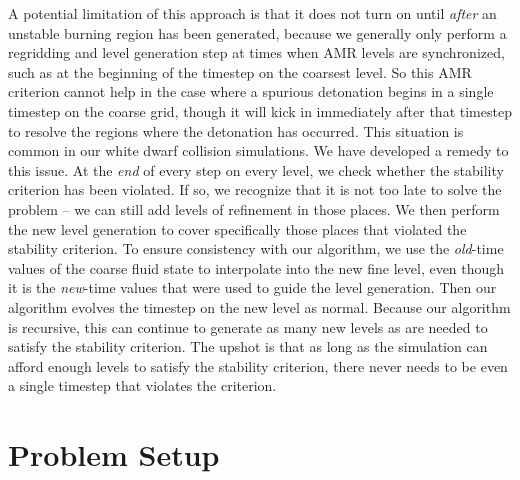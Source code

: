 \documentclass[twocolumn,numberedappendix]{../aastex6}
\begin{document}
A potential limitation of this approach is that it does not turn on
until \textit{after} an unstable burning region has been generated,
because we generally only perform a regridding and level generation
step at times when AMR levels are synchronized, such as at the beginning
of the timestep on the coarsest level. So this AMR criterion cannot
help in the case where a spurious detonation begins in a single timestep
on the coarse grid, though it will kick in immediately after that
timestep to resolve the regions where the detonation has occurred.
This situation is common in our white dwarf collision simulations.
We have developed a remedy to this issue. At the \textit{end} of every step
on every level, we check whether the stability criterion has been violated.
If so, we recognize that it is not too late to solve the problem -- we can
still add levels of refinement in those places. We then perform the new level
generation to cover specifically those places that violated the stability criterion.
To ensure consistency with our algorithm, we use the \textit{old}-time values
of the coarse fluid state to interpolate into the new fine level, even
though it is the \textit{new}-time values that were used to guide the level
generation. Then our algorithm evolves the timestep on the new level as normal.
Because our algorithm is recursive, this can continue to generate
as many new levels as are needed to satisfy the stability criterion.
The upshot is that as long as the simulation can afford enough levels to
satisfy the stability criterion, there never needs to be even a single timestep
that violates the criterion.



\section{Problem Setup}
\label{sec:problemsetup}
\end{document}
